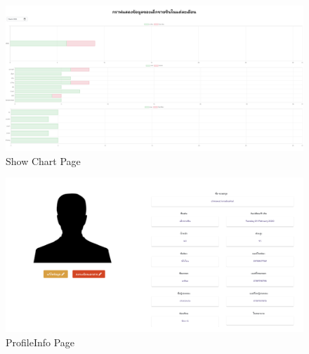 \begin{figure}
  \begin{center}
  \includegraphics[width=\linewidth]{images/ChartPage.png}
  \end{center}
  \caption[หน้าแสดงข้อมูลรายเดือนเด็ก]{Show Chart Page}
  \label{fig:ChartPage}
  \end{figure}
  
\begin{figure}
  \begin{center}
  \includegraphics[width=\linewidth]{images/ProfileInfo.png}
  \end{center}
  \caption[หน้าประวัติส่วนตัวเด็ก]{ProfileInfo Page}
  \label{fig:ProfileTwo}
  \end{figure}

